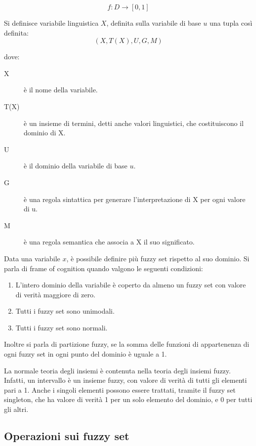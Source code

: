 \begin{equation*}
 f:D\rightarrow [0, 1]
\end{equation*}

Si definisce variabile linguistica $X$, definita sulla variabile di base $u$ una tupla così definita:
\begin{equation*}
(X, T(X), U, G, M)
\end{equation*}

dove:

\begin{description}
 \item [X] è il nome della variabile.
 \item [T(X)] è un insieme di termini, detti anche valori linguistici, che costituiscono il dominio di X.
 \item [U] è il dominio della variabile di base $u$.
 \item [G] è una regola sintattica per generare l'interpretazione di X per ogni valore di u.
 \item [M] è una regola semantica che associa a X il suo significato.
\end{description}


Data una variabile $x$, è possibile definire più fuzzy set rispetto al suo dominio. Si parla di frame of cognition quando valgono le seguenti condizioni:
\begin{enumerate}
 \item L'intero dominio della variabile è coperto da almeno un fuzzy set con valore di verità maggiore di zero.
 \item Tutti i fuzzy set sono unimodali.
 \item Tutti i fuzzy set sono normali.
\end{enumerate}

Inoltre si parla di partizione fuzzy, se la somma delle funzioni di appartenenza di ogni fuzzy set in ogni punto del dominio è uguale a 1.

La normale teoria degli insiemi è contenuta nella teoria degli insiemi fuzzy. Infatti, un intervallo è un insieme fuzzy, con valore di verità di tutti gli elementi pari a 1. Anche i singoli elementi possono essere trattati, tramite il fuzzy set singleton, che ha valore di verità 1 per un solo elemento del dominio, e 0 per tutti gli altri.

\subsection{Operazioni sui fuzzy set}


